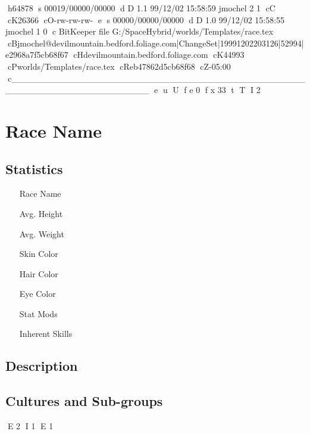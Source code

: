 h64878
s 00019/00000/00000
d D 1.1 99/12/02 15:58:59 jmochel 2 1
cC
cK26366
cO-rw-rw-rw-
e
s 00000/00000/00000
d D 1.0 99/12/02 15:58:55 jmochel 1 0
c BitKeeper file G:/SpaceHybrid/worlds/Templates/race.tex
cBjmochel@devilmountain.bedford.foliage.com|ChangeSet|19991202203126|52994|e2968a7f5cb68f67
cHdevilmountain.bedford.foliage.com
cK44993
cPworlds/Templates/race.tex
cReb47862d5cb68f68
cZ-05:00
c______________________________________________________________________
e
u
U
f e 0
f x 33
t
T
I 2
\chapter{Race Name}

\section{Statistics}

\begin{itemize}
	\item[Race Name]
	\item[Avg. Height]
	\item[Avg. Weight]
	\item[Skin Color]
	\item[Hair Color]
	\item[Eye Color]
	\item[Stat Mods]
	\item[Inherent Skills]
\end{itemize}

\section{Description}

\section{Cultures and Sub-groups}

E 2
I 1
E 1
